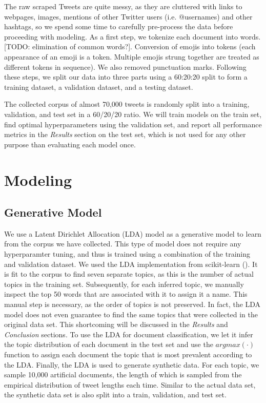 \documentclass[11pt]{article}
\begin{document}
The raw scraped Tweets are quite messy, as they are cluttered with links to webpages, images, mentions of other Twitter users (i.e. @usernames) and other hashtags, so we spend some time to carefully pre-process the data before proceeding with modeling. As a first step, we tokenize each document into words. [TODO: elimination of common words?]. Conversion of emojis into tokens (each appearance of an emoji is a token. Multiple emojis strung together are treated as different tokens in sequence). We also removed punctuation marks. Following these steps, we split our data into three parts using a 60:20:20 split to form a training dataset, a validation dataset, and a testing dataset. 

The collected corpus of almost 70,000 tweets is randomly split into a training, validation, and test set in a 60/20/20 ratio. We will train models on the train set, find optimal hyperparameters using the validation set, and report all performance metrics in the \emph{Results} section on the test set, which is not used for any other purpose than evaluating each model once.



\noindent 



\section{Modeling}
\subsection{Generative Model}
We use a Latent Dirichlet Allocation (LDA) model as a generative model to learn from the corpus we have collected. This type of model does not require any hyperparamter tuning, and thus is trained using a combination of the training and validation dataset. We used the LDA implementation from scikit-learn (\cite{sklearn}). It is fit to the corpus to find seven separate topics, as this is the number of actual topics in the training set. Subsequently, for each inferred topic, we manually inspect the top 50 words that are associated with it to assign it a name. This manual step is necessary, as the order of topics is not preserved. In fact, the LDA model does not even guarantee to find the same topics that were collected in the original data set. This shortcoming will be discussed in the \emph{Results} and \emph{Conclusion} sections. 
To use the LDA for document classification,  we let it infer the topic distribution of each document in the test set and use the $argmax(\cdot)$ function to assign each document the topic that is most prevalent according to the LDA.
Finally, the LDA is used to generate synthetic data. For each topic, we sample 10,000 artificial documents, the length of which is sampled from the empirical distribution of tweet lengths each time. Similar to the actual data set, the synthetic data set is also split into a train, validation, and test set.
\end{document}
